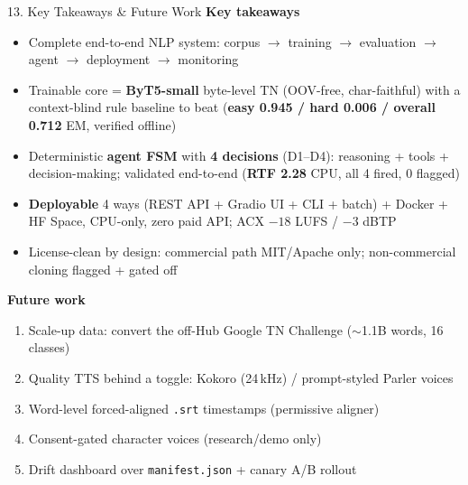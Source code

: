 \documentclass[10pt,aspectratio=169]{beamer}
\begin{document}
\begin{frame}{13. Key Takeaways \& Future Work}
\textbf{Key takeaways}
\begin{itemize}\small
  \item Complete end-to-end NLP system: corpus $\rightarrow$ training $\rightarrow$ evaluation $\rightarrow$ agent $\rightarrow$ deployment $\rightarrow$ monitoring
  \item Trainable core = \textbf{ByT5-small} byte-level TN (OOV-free, char-faithful) with a context-blind rule baseline to beat (\textbf{easy 0.945 / hard 0.006 / overall 0.712} EM, verified offline)
  \item Deterministic \textbf{agent FSM} with \textbf{4 decisions} (D1--D4): reasoning + tools + decision-making; validated end-to-end (\textbf{RTF 2.28} CPU, all 4 fired, 0 flagged)
  \item \textbf{Deployable} 4 ways (REST API + Gradio UI + CLI + batch) + Docker + HF Space, CPU-only, zero paid API; ACX $-18$ LUFS / $-3$ dBTP
  \item License-clean by design: commercial path MIT/Apache only; non-commercial cloning flagged + gated off
\end{itemize}

\textbf{Future work}
\begin{enumerate}\small
  \item Scale-up data: convert the off-Hub Google TN Challenge ($\sim$1.1B words, 16 classes)
  \item Quality TTS behind a toggle: Kokoro (24\,kHz) / prompt-styled Parler voices
  \item Word-level forced-aligned \texttt{.srt} timestamps (permissive aligner)
  \item Consent-gated character voices (research/demo only)
  \item Drift dashboard over \texttt{manifest.json} + canary A/B rollout
\end{enumerate}
\end{frame}
\end{document}
